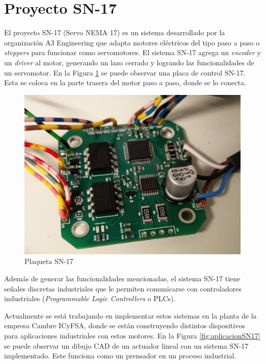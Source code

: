 

\section{Proyecto SN-17}

El proyecto SN-17 (Servo NEMA 17) es un sistema desarrollado por la organización A3 Engineering que adapta motores eléctricos del tipo paso a paso o \textit{steppers} para funcionar como servomotores. El sistema SN-17 agrega un \textit{encoder} y un \textit{driver} al motor, generando un lazo cerrado y logrando las funcionalidades de un servomotor. En la Figura \ref{fig:SN17} se puede observar una placa de control SN-17. Esta se coloca en la parte trasera del motor paso a paso, donde se lo conecta.

\begin{figure}[htbp]
	\centering
	\includegraphics[scale=.4]{./Figures/SN17_5.jpeg}
	\caption{Plaqueta SN-17}
	\label{fig:SN17}
\end{figure}

Además de generar las funcionalidades mencionadas, el sistema SN-17 tiene señales discretas industriales que le permiten comunicarse con controladores industriales (\textit{Programmable Logic Controllers} o PLCs).

Actualmente se está trabajando en implementar estos sistemas en la planta de la empresa Cambre ICyFSA\citep{web_cambre}, donde se están construyendo distintos dispositivos para aplicaciones industriales con estos motores. En la Figura \ref{fig:aplicacionSN17} se puede observar un dibujo CAD de un actuador lineal con un sistema SN-17 implementado. Este funciona como un prensador en un proceso industrial.

